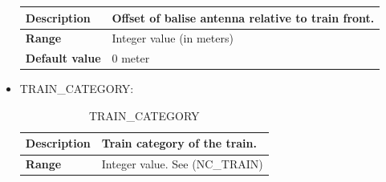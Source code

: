 \documentclass{template/openetcs}
\begin{document}
\begin{itemize}
\begin{longtable}{|l|l|}
					\begin{minipage}[t]{0.22\linewidth} \textbf{Description}	\end{minipage} 
				&	\begin{minipage}[t]{0.78\linewidth} Offset of balise antenna relative to train front. \end{minipage} \\
				
				\hline
																																									
					\begin{minipage}[t]{0.22\linewidth} \textbf{Range}	\end{minipage} 
				&	\begin{minipage}[t]{0.78\linewidth} Integer value (in meters) \end{minipage} \\
				
				\hline
				
					\begin{minipage}[t]{0.22\linewidth} \textbf{Default value}	\end{minipage} 
				&	\begin{minipage}[t]{0.78\linewidth} 0 meter \end{minipage} \\
				
				\hline
				
			\end{longtable}
			
		\item TRAIN\_CATEGORY:
																			
			\begin{longtable}{|l|l|}
				\caption{TRAIN\_CATEGORY}\\ 
				\hline
				
					\begin{minipage}[t]{0.22\linewidth} \textbf{Description}	\end{minipage} 
				&	\begin{minipage}[t]{0.78\linewidth} Train category of the train. \end{minipage} \\
				
				\hline
																																									
					\begin{minipage}[t]{0.22\linewidth} \textbf{Range}	\end{minipage} 
				&	\begin{minipage}[t]{0.78\linewidth} Integer value. See (NC\_TRAIN) \end{minipage} \\
				

\end{longtable}
\end{itemize}
\end{document}
